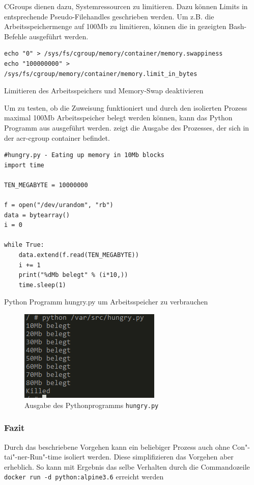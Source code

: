 CGroups dienen dazu, Systemressourcen zu limitieren. Dazu können Limits in entsprechende Pseudo-Filehandles geschrieben werden. Um z.B. die Arbeitsspeichermenge auf \tildeawesome100Mb zu limitieren, können die in  gezeigten Bash-Befehle ausgeführt werden. 

\begin{listing}[h]
	\begin{verbatim}
echo "0" > /sys/fs/cgroup/memory/container/memory.swappiness
echo "100000000" > /sys/fs/cgroup/memory/container/memory.limit_in_bytes
	\end{verbatim}
	\caption{Limitieren des Arbeitsspeichers und Memory-Swap deaktivieren}
	\label{lst:limitRam}
\end{listing}

Um zu testen, ob die Zuweisung funktioniert und durch den isolierten Prozess maximal \tildeawesome100Mb Arbeitsspeicher belegt werden können, kann das Python Programm aus  ausgeführt werden.  zeigt die Ausgabe des Prozesses, der sich in der \gls{acr-cgroup} container befindet.

\begin{listing}[hp]
	\begin{verbatim}
#hungry.py - Eating up memory in 10Mb blocks
import time

TEN_MEGABYTE = 10000000

f = open("/dev/urandom", "rb")
data = bytearray()
i = 0

while True:
	data.extend(f.read(TEN_MEGABYTE))
	i += 1
	print("%dMb belegt" % (i*10,))
	time.sleep(1)
	\end{verbatim}
	\caption{Python Programm hungry.py um Arbeitsspeicher zu verbrauchen}
	\label{lst:hungry-py}
\end{listing}


\begin{figure}[hp]
	 \begin{center}
	 	\includegraphics[scale=1.3]{bilder/cgroup-container-killed.png}
	 	\caption{Ausgabe des Pythonprogramms \texttt{hungry.py}}
	 	\label{fig:cgroupKilled}
	 \end{center}
\end{figure}

\subsubsection{Fazit}
\label{sec:eigImplFazit}

Durch das beschriebene Vorgehen kann ein beliebiger Prozess auch ohne Con"-tai"-ner-Run"-time isoliert werden. Diese simplifizieren das Vorgehen aber erheblich. So kann mit Ergebnis das selbe Verhalten durch die Commandozeile \texttt{docker run -d python:alpine3.6} erreicht werden